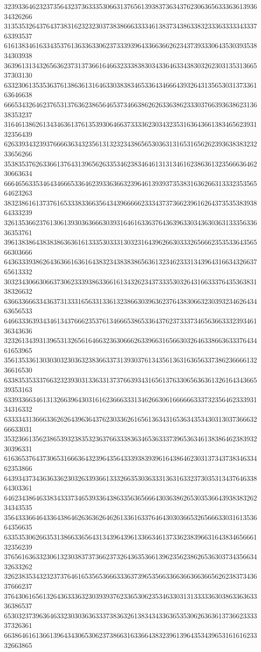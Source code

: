 32393364623237356432373633353066313765613938373634376230636563336361393634326266
31353532643764373831623232303738386663333461383734386338323336333334333763393537
61613834616334353761363363306237333939643366366262343739333064353039353834303938
36396131343265636237313736616466323338383034336463343830326230313531366537303130
63323061353536376138636131646330383834653364346664393264313565303137336163646638
66653432646237653137636238656465373466386262633638623330376639363862313638353237
31646138626134346361376135393064663733336230343235316364366138346562393132356439
62633934323937666636343235613132323438656530363131653165626239363838323233656266
35383537626336613764313965626335346238346461313134616238636132356663646230663634
66646563353464346665336462393363663239646139393735383163626631333235356564623263
38323861613737616533383366356434396666623334373736623961626437353538393864333239
32613536623761306139303636663039316461633637643639633034363036313335633636353761
39613838643838386363616133353033313032316439626630333265666235353364356566303666
64363339386264363661636164383234383838656361323462333134396431663432663765613332
30323430663066373062333938633661613432623437333530326431663337643536383138326632
63663366633436373133316563313361323866303963623764383066323039323462643463656533
64663336393434613437666235376134666538653364376237333734656366333239346136343636
32326134393139653132656164663236306662633966316566303264633866363337643461653965
35613533613030303230363238366337313930376134356136316365633738623666613236616530
63383535333766323239303133633137376639343165613763306563636132616434366539353163
63393366346131326639643031616236663331346266306166666633373235646233393134316332
63333431366633626264396364376230336261656136343165363435343031303736663266633031
35323661356238653932383532363766333836346536333739653634613838646238393230396331
61636537643730653166636432396435643339383939616438646230313734373834633462353866
64393437343636336230326339366133326635303633313631633237303531343764633864303361
64623438646338343337346539336438633563656664303638626530353664393838326234343535
35643336646433643864626363626462613361633764643030366532656663303161353664356635
63353530626635313866336564313439643961336634613733623839663164383465666132356239
37656163633230613230383737366237326436353661396235623862653630373435663432633262
32623835343232373764616535653666333637396535663366366366366562623837343637666237
37643061656132643633363230393937623365306235346330313133333630386336363336386537
65303237396364633230303636333738363261383434336365353062636361373662333337326361
66386461613661396434306530623738663163366438323961396435343965316161623332663865
